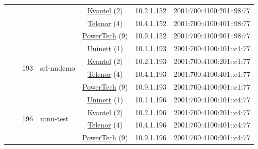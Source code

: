 \begin{small}
\begin{center}
\begin{longtable}{|c|c|c|c|c|c|c|c|}
  &  &  &  & \multicolumn{2}{|c|}{\tiny{\href{http://kvantel.no}{Kvantel} (2)}} & \tiny{10.2.1.152} & \tiny{2001:700:4100:201::98:77} \\* \cline{5-5}\cline{6-6}\cline{7-7}\cline{8-8}
  &  &  &  & \multicolumn{2}{|c|}{\tiny{\href{https://www.telenor.no}{Telenor} (4)}} & \tiny{10.4.1.152} & \tiny{2001:700:4100:401::98:77} \\* \cline{5-5}\cline{6-6}\cline{7-7}\cline{8-8}
  &  &  &  & \multicolumn{2}{|c|}{\tiny{\href{http://www.powertech.no}{PowerTech} (9)}} & \tiny{10.9.1.152} & \tiny{2001:700:4100:901::98:77} \\* \cline{3-3}\cline{4-4}\cline{5-5}\cline{6-6}\cline{7-7}\cline{8-8}
  &  & \multirow{4}{*}{\tiny{193}} & \multicolumn{1}{|l|}{\multirow{4}{*}{\tiny{srl-nndemo}}} & \multicolumn{2}{|c|}{\tiny{\href{https://www.uninett.no}{Uninett} (1)}} & \tiny{10.1.1.193} & \tiny{2001:700:4100:101::c1:77} \\* \cline{5-5}\cline{6-6}\cline{7-7}\cline{8-8}
  &  &  &  & \multicolumn{2}{|c|}{\tiny{\href{http://kvantel.no}{Kvantel} (2)}} & \tiny{10.2.1.193} & \tiny{2001:700:4100:201::c1:77} \\* \cline{5-5}\cline{6-6}\cline{7-7}\cline{8-8}
  &  &  &  & \multicolumn{2}{|c|}{\tiny{\href{https://www.telenor.no}{Telenor} (4)}} & \tiny{10.4.1.193} & \tiny{2001:700:4100:401::c1:77} \\* \cline{5-5}\cline{6-6}\cline{7-7}\cline{8-8}
  &  &  &  & \multicolumn{2}{|c|}{\tiny{\href{http://www.powertech.no}{PowerTech} (9)}} & \tiny{10.9.1.193} & \tiny{2001:700:4100:901::c1:77} \\* \cline{3-3}\cline{4-4}\cline{5-5}\cline{6-6}\cline{7-7}\cline{8-8}
  &  & \multirow{4}{*}{\tiny{196}} & \multicolumn{1}{|l|}{\multirow{4}{*}{\tiny{ntnu-test}}} & \multicolumn{2}{|c|}{\tiny{\href{https://www.uninett.no}{Uninett} (1)}} & \tiny{10.1.1.196} & \tiny{2001:700:4100:101::c4:77} \\* \cline{5-5}\cline{6-6}\cline{7-7}\cline{8-8}
  &  &  &  & \multicolumn{2}{|c|}{\tiny{\href{http://kvantel.no}{Kvantel} (2)}} & \tiny{10.2.1.196} & \tiny{2001:700:4100:201::c4:77} \\* \cline{5-5}\cline{6-6}\cline{7-7}\cline{8-8}
  &  &  &  & \multicolumn{2}{|c|}{\tiny{\href{https://www.telenor.no}{Telenor} (4)}} & \tiny{10.4.1.196} & \tiny{2001:700:4100:401::c4:77} \\* \cline{5-5}\cline{6-6}\cline{7-7}\cline{8-8}
  &  &  &  & \multicolumn{2}{|c|}{\tiny{\href{http://www.powertech.no}{PowerTech} (9)}} & \tiny{10.9.1.196} & \tiny{2001:700:4100:901::c4:77} \\ \hline
\end{longtable}
\end{center}
\end{small}



